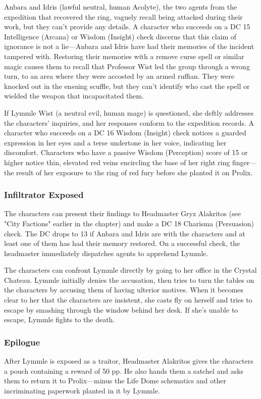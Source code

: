 \documentclass[10pt,a4paper,twoside,twocolumn,openany,nodeprecatedcode]{dndbook}
\begin{document}
Anbara and Idris (lawful neutral, human Acolyte), the two agents from the expedition that recovered the ring, vaguely recall being attacked during their work, but they can't provide any details. A character who succeeds on a DC 15 Intelligence (Arcana) or Wisdom (Insight) check discerns that this claim of ignorance is not a lie—Anbara and Idris have had their memories of the incident tampered with. Restoring their memories with a remove curse spell or similar magic causes them to recall that Professor Wist led the group through a wrong turn, to an area where they were accosted by an armed ruffian. They were knocked out in the ensuing scuffle, but they can't identify who cast the spell or wielded the weapon that incapacitated them.

If Lymmle Wist (a neutral evil, human mage) is questioned, she deftly addresses the characters' inquiries, and her responses conform to the expedition records. A character who succeeds on a DC 16 Wisdom (Insight) check notices a guarded expression in her eyes and a terse undertone in her voice, indicating her discomfort. Characters who have a passive Wisdom (Perception) score of 15 or higher notice thin, elevated red veins encircling the base of her right ring finger—the result of her exposure to the ring of red fury before she planted it on Prolix.

\subsubsection{Infiltrator Exposed}
The characters can present their findings to Headmaster Gryz Alakritos (see "City Factions" earlier in the chapter) and make a DC 18 Charisma (Persuasion) check. The DC drops to 13 if Anbara and Idris are with the characters and at least one of them has had their memory restored. On a successful check, the headmaster immediately dispatches agents to apprehend Lymmle.

The characters can confront Lymmle directly by going to her office in the Crystal Chateau. Lymmle initially denies the accusation, then tries to turn the tables on the characters by accusing them of having ulterior motives. When it becomes clear to her that the characters are insistent, she casts fly on herself and tries to escape by smashing through the window behind her desk. If she's unable to escape, Lymmle fights to the death.

\subsubsection{Epilogue}
After Lymmle is exposed as a traitor, Headmaster Alakritos gives the characters a pouch containing a reward of 50 pp. He also hands them a satchel and asks them to return it to Prolix—minus the Life Dome schematics and other incriminating paperwork planted in it by Lymmle.
\end{document}
